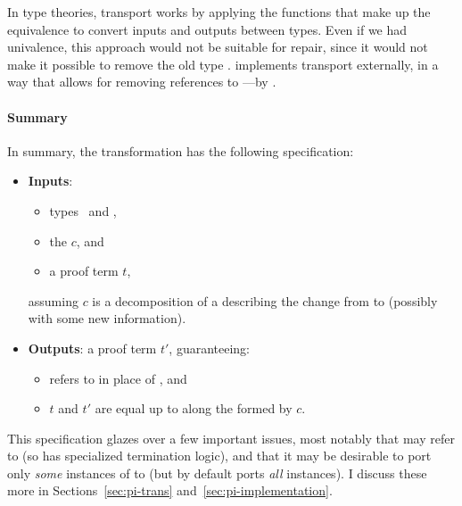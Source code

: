 In  type theories, transport works by applying the functions that make up the equivalence to convert
inputs and outputs between types.
Even if we had univalence, this approach would not be suitable for repair, since it would not make it possible to remove the old type \Aa.
\toolnamec implements transport externally, in a way that allows for removing references to \Aa---by .

\paragraph{Summary}

In summary, the transformation has the following specification:

\begin{itemize}
\item \textbf{Inputs}:
\begin{itemize}
\item types \Aa\ and \B,
\item the  $c$, and
\item a proof term $t$,
\end{itemize}
assuming $c$ is a decomposition of a  describing the change from \Aa to \B (possibly with some new information).
\item \textbf{Outputs}: a proof term $t'$, guaranteeing:
\begin{itemize}
\item {} refers to \B in place of \Aa, and
\item $t$ and $t'$ are equal up to  along the  formed by $c$.
\end{itemize}
\end{itemize}
This specification glazes over a few important issues, most notably that \B may refer to \Aa (so \toolnamec has specialized termination logic),
and that it may be desirable to port only \textit{some} instances of \Aa to \B (but \toolnamec by default ports \textit{all} instances). 
I discuss these more in Sections~\ref{sec:pi-trans} and~\ref{sec:pi-implementation}.

